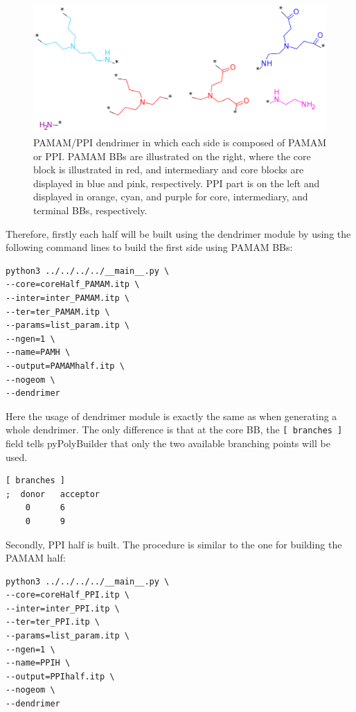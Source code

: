 \begin{figure}
    \centering
    \includegraphics[width=\textwidth]{PAMAM_PPI-half/PAMAMPPIBBs.png}
    \caption{PAMAM/PPI dendrimer in which each side is composed of PAMAM or PPI. PAMAM BBs are illustrated on the right, where the core block is illustrated in red, and intermediary and core blocks are displayed in blue and pink, respectively. PPI part is on the left and displayed in orange, cyan, and purple for core, intermediary, and terminal BBs, respectively.}
    \label{fig:HalfBBs}
\end{figure}

Therefore, firstly each half will be built using the dendrimer module by using the following command lines to build the first side using PAMAM BBs:

\begin{lstlisting}
python3 ../../../../__main__.py \
--core=coreHalf_PAMAM.itp \
--inter=inter_PAMAM.itp \
--ter=ter_PAMAM.itp \
--params=list_param.itp \
--ngen=1 \
--name=PAMH \
--output=PAMAMhalf.itp \
--nogeom \
--dendrimer
\end{lstlisting}

Here the usage of dendrimer module is exactly the same as when generating a whole dendrimer.
The only difference is that at the core BB, the \texttt{[ branches ]} field tells pyPolyBuilder that only the two available branching points will be used.

\begin{lstlisting}
[ branches ]
;  donor   acceptor
    0      6
    0      9
\end{lstlisting}

Secondly, PPI half is built.
The procedure is similar to the one for building the PAMAM half:

\begin{lstlisting}
python3 ../../../../__main__.py \
--core=coreHalf_PPI.itp \
--inter=inter_PPI.itp \
--ter=ter_PPI.itp \
--params=list_param.itp \
--ngen=1 \
--name=PPIH \
--output=PPIhalf.itp \
--nogeom \
--dendrimer
\end{lstlisting}

